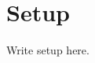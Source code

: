 \documentclass[a4paper,11pt,oneside,openany,fleqn]{jsbook}
\begin{document}
    \chapter{Setup}
        Write setup here.
\end{document}
